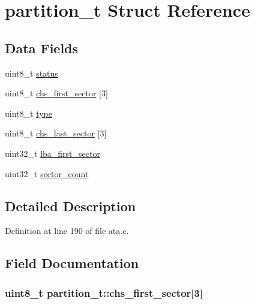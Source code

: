 \hypertarget{structpartition__t}{}\section{partition\+\_\+t Struct Reference}
\label{structpartition__t}
\subsection*{Data Fields}
\begin{DoxyCompactItemize}
\item 
uint8\+\_\+t \hyperlink{structpartition__t_a567c26aadcffa836d35e6998a5b0725a}{status}
\item 
uint8\+\_\+t \hyperlink{structpartition__t_ad19616951260f45602dfbdb795665c99}{chs\+\_\+first\+\_\+sector} \mbox{[}3\mbox{]}
\item 
uint8\+\_\+t \hyperlink{structpartition__t_a587990aa2b5ef1c4c206bb469160288f}{type}
\item 
uint8\+\_\+t \hyperlink{structpartition__t_a6d59b11236b1152a4c5c6bd95e0da572}{chs\+\_\+last\+\_\+sector} \mbox{[}3\mbox{]}
\item 
uint32\+\_\+t \hyperlink{structpartition__t_a8e9cf3ec4df990b9d7be97d8fb3f784d}{lba\+\_\+first\+\_\+sector}
\item 
uint32\+\_\+t \hyperlink{structpartition__t_a0a7b2794fde517b15f4d26742073e3c4}{sector\+\_\+count}
\end{DoxyCompactItemize}


\subsection{Detailed Description}


Definition at line 190 of file ata.\+c.



\subsection{Field Documentation}
\subsubsection[{\texorpdfstring{chs\+\_\+first\+\_\+sector}{chs_first_sector}}]{\setlength{\rightskip}{0pt plus 5cm}uint8\+\_\+t partition\+\_\+t\+::chs\+\_\+first\+\_\+sector\mbox{[}3\mbox{]}}\hypertarget{structpartition__t_ad19616951260f45602dfbdb795665c99}{}\label{structpartition__t_ad19616951260f45602dfbdb795665c99}


